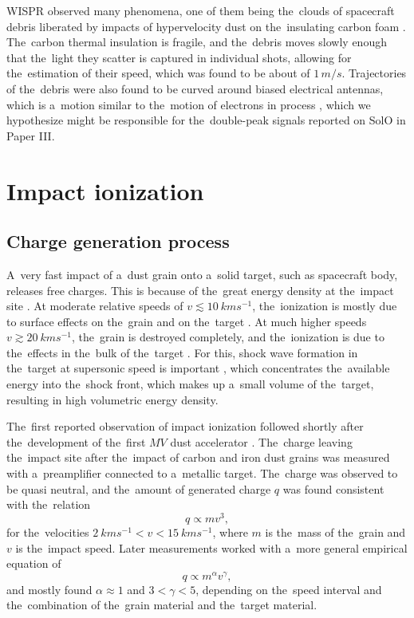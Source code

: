 WISPR observed many phenomena, one of them being the~clouds of spacecraft debris liberated by impacts of hypervelocity dust on the~insulating carbon foam \citep{malaspina2022clouds}. The~carbon thermal insulation is fragile, and the~debris moves slowly enough that the~light they scatter is captured in individual shots, allowing for the~estimation of their speed, which was found to be about of $1 \, \si{m/s}$. Trajectories of the~debris were also found to be curved around biased electrical antennas, which is a~motion similar to the~motion of electrons in \citeauthor{pantellini2012nano} process \citep{pantellini2012nano}, which we hypothesize might be responsible for the~double-peak signals reported on SolO in Paper III. 


\section{Impact ionization}

\subsection{Charge generation process}

A~very fast impact of a~dust grain onto a~solid target, such as spacecraft body, releases free charges. This is because of the~great energy density at the~impact site \citep{shen2021cosmic}. At moderate relative speeds of $v \lesssim \SI{10}{kms^{-1}}$, the~ionization is mostly due to surface effects on the~grain and on the~target \citep{kissel1987ion}. At much higher speeds $v \gtrsim \SI{20}{kms^{-1}}$, the~grain is destroyed completely, and the~ionization is due to the~effects in the~bulk of the~target \citep{hornung1994shock}. For this, shock wave formation in the~target at supersonic speed is important \citep{drapatz1974theory}, which concentrates the~available energy into the~shock front, which makes up a~small volume of the~target, resulting in high volumetric energy density. 

The~first reported observation \citep{friichtenicht1964} of impact ionization followed shortly after the~development of the~first $MV$ dust accelerator \citep{friichtenicht1962}. The~charge leaving the~impact site after the~impact of carbon and iron dust grains was measured with a~preamplifier connected to a~metallic target. The~charge was observed to be quasi neutral, and the~amount of generated charge $q$ was found consistent with the~relation
\begin{equation}
    q \propto m v^3,
\end{equation}
for the~velocities  $\SI{2}{kms^{-1}} < v < \SI{15}{kms^{-1}}$, where $m$ is the~mass of the~grain and $v$ is the~impact speed. Later measurements \citep{auer1968,mcbride1999meteoroid,grun1984impact,collette2014micrometeoroid,shen2021cosmic} worked with a~more general empirical equation of 
\begin{equation}
    q \propto m^\alpha v^\gamma, \label{eq:charge_generation}
\end{equation}
and mostly found $\alpha \approx 1$ and $3 < \gamma < 5$, depending on the~speed interval and the~combination of the~grain material and the~target material. 

